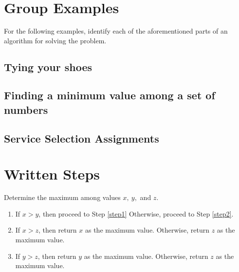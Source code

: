 \documentclass[12pt]{article}
\theoremstyle{definition}
\begin{document}
\section{Group Examples}

For the following examples, identify each of the aforementioned parts of an algorithm for solving the problem.

\subsection*{Tying your shoes}

\vskip 4cm

\subsection*{Finding a minimum value among a set of numbers}


\vskip 4cm

\subsection*{Service Selection Assignments}


\vskip 4cm
\newpage




\section{Written Steps}

Determine the maximum among values $x, \ y,$ and $z$.

\begin{enumerate}

\item If $x > y$, then proceed to Step \ref{step1} Otherwise, proceed to Step \ref{step2}.

\item If $x > z$, then return $x$ as the maximum value. Otherwise, return $z$ as the maximum value. \label{step1}

\item If $y > z$, then return $y$ as the maximum value. Otherwise, return $z$ as the maximum value. \label{step2}
\end{enumerate}
\end{document}
